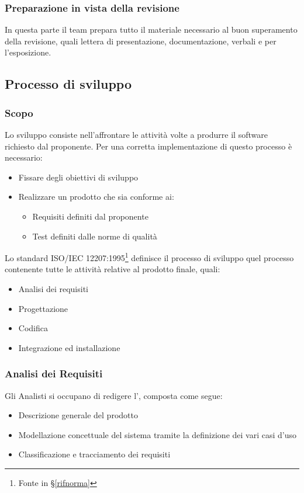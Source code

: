         \subsubsection{Preparazione in vista della revisione}
		In questa parte il team prepara tutto il materiale necessario al buon superamento della revisione, quali lettera di presentazione,
		documentazione, verbali e  per l'esposizione.


    \subsection{Processo di sviluppo}\label{PP:Sviluppo}

		\subsubsection{Scopo}\label{PP:Sviluppo:Scopo}
		Lo sviluppo consiste nell'affrontare le attività volte a produrre il software richiesto dal proponente. Per una corretta implementazione di questo processo è
		necessario:
		\begin{itemize}
			\item Fissare degli obiettivi di sviluppo
			\item Realizzare un prodotto che sia conforme ai:
			\begin{itemize}
				\item Requisiti definiti dal proponente
				\item Test definiti dalle norme di qualità
			\end{itemize}
		\end{itemize}
		Lo standard ISO/IEC 12207:1995\footnote{Fonte in \S\ref{rifnorma}} definisce il processo di sviluppo quel processo
		contenente tutte le attività relative al prodotto finale, quali:
		\begin{itemize} %
			\item Analisi dei requisiti
			\item Progettazione
			\item Codifica
			\item Integrazione ed installazione
		\end{itemize}


        \subsubsection{Analisi dei Requisiti}\label{PP:Sviluppo:AdR}
		Gli Analisti si occupano di redigere l'\Doc{\AdRv}, composta come segue:
		\begin{itemize}
			\item Descrizione generale del prodotto
			\item Modellazione concettuale del sistema tramite la definizione dei vari casi d'uso
			\item Classificazione e tracciamento dei requisiti
		\end{itemize}

